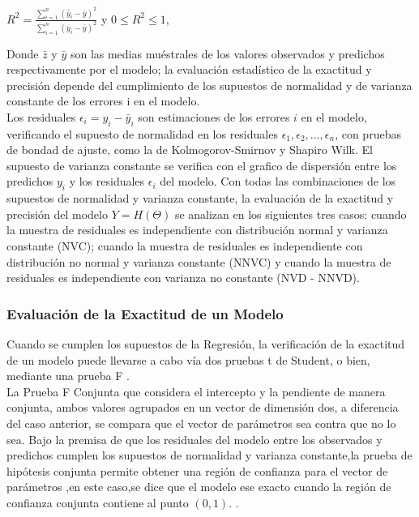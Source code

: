 \begin{center}
{\Large $R^{2} = \frac{ \sum_{i=1}^{n} ( \hat{y}_{i} - \bar{y})^{2}} { \sum_{i=1}^{n} ( y_{i} - \bar{y})^{2}  }$ }  y  $ 0 \leq R^{2} \leq 1$,
\end{center}


Donde $ \bar{z}$ y $ \bar{y}$ son las medias muéstrales de los valores observados y predichos respectivamente por el modelo; la evaluación estadístico de la exactitud y precisión depende del cumplimiento de los supuestos de normalidad y de varianza constante de los errores i en el modelo. \\


Los residuales $\epsilon_{i} = y_{i} - \bar{y}_{i}$ son estimaciones de los errores $i$ en el modelo, verificando el  supuesto de normalidad en los residuales $\epsilon_{1}, \epsilon_{2} , \dots, \epsilon_{n} $, con pruebas de bondad de ajuste, como la de Kolmogorov-Smirnov y Shapiro Wilk. El supuesto de varianza constante se verifica con el grafico de dispersión entre los predichos $y_{i}$ y los residuales $\epsilon_{i}$ del modelo. Con todas las combinaciones de los supuestos de normalidad y varianza constante, la evaluación de la exactitud y precisión del modelo $Y = H(\Theta )$ se analizan en los siguientes tres casos: cuando la muestra de residuales es independiente con distribución normal y varianza constante (NVC); cuando la muestra de residuales es independiente con distribución no normal y varianza constante (NNVC) y cuando la muestra
de residuales es independiente con varianza no constante (NVD - NNVD).

\subsubsection{Evaluación de la Exactitud de un Modelo}

Cuando se cumplen los supuestos de la Regresión, la verificación de la exactitud de un modelo puede llevarse a cabo vía dos pruebas t de Student, o bien, mediante una prueba F \parencite{balam-2012}.\\

La Prueba F Conjunta que considera el intercepto y la pendiente de manera conjunta, ambos valores agrupados en un vector de dimensión dos, a diferencia del caso anterior, se compara que el vector de parámetros  sea  contra que no lo sea. Bajo la premisa de que los residuales del modelo entre los observados y predichos cumplen los supuestos de normalidad y varianza constante,la prueba de hipótesis conjunta permite obtener una región de confianza para el vector de parámetros ,en este caso,se dice que el modelo ese exacto cuando la región de confianza conjunta contiene al punto $(0,1)$. \parencite{zacarias-2023}.\\

